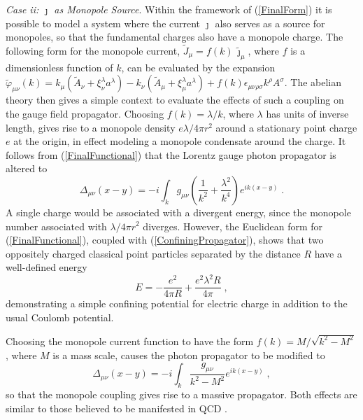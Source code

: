 \documentclass[a4paper,a4paper]{article}
\begin{document}
{\it Case ii: $\jmath$ as Monopole Source}.  Within the framework of (\ref{FinalForm}) it is possible to model a system where the current $\jmath$ also serves as a source for monopoles, so that the fundamental charges also have a monopole charge. The following form for the monopole current, $\tilde{J}_\mu  = f(k) \, \tilde{\jmath}_\mu$, where $f$ is a dimensionless function of $k$, can be evaluated by the expansion $\tilde{\varphi}_{\mu \nu} (k)  =   k_\mu ( \tilde{A}_\nu  + \xi^\lambda_\nu a^\lambda )  - k_\nu (  \tilde{A}_\mu  + \xi^\lambda_\mu a^\lambda ) + f(k) \epsilon_{\mu \nu \rho \sigma} k^\rho A^\sigma$.   The abelian theory then gives a simple context to evaluate the effects of such a coupling on the gauge field propagator.  Choosing $f(k) = \lambda/k$, where $\lambda$ has units of inverse length, gives rise to a monopole density $e \lambda / 4 \pi r^2$ around a stationary point charge $e$ at the origin, in effect modeling a monopole condensate around the charge.  It follows from (\ref{FinalFunctional}) that the Lorentz gauge photon propagator is altered to 
\begin{equation}
\label{ConfiningPropagator}
\Delta_{\mu \nu} (x - y)  = - i \int_k g_{\mu \nu} \left( \frac{1}{k^2} + \frac{\lambda^2}{k^4}  \right) e^{ik ( x - y ) } \;.
\end{equation}
A single charge would be associated with a divergent energy, since the monopole number associated with $\lambda/4 \pi r^2$ diverges. However, the Euclidean form for (\ref{FinalFunctional}), coupled with (\ref{ConfiningPropagator}), shows that two oppositely charged classical point particles separated by the distance $R$ have a well-defined energy  
\begin{equation}
\label{ConfiningPotential}
E = - \frac{e^2}{4 \pi R} + \frac{e^2 \lambda^2 R}{4 \pi} \; ,
\end{equation}
demonstrating a simple confining potential for electric charge in addition to the usual Coulomb potential. 

Choosing the monopole current function to have the form $f(k) = M/\sqrt{k^2 - M^2}$, where $M$ is a mass scale, causes the photon propagator to be modified to
\begin{equation}
\label{MassivePropagator}
\Delta_{\mu \nu} (x - y)  = - i \int_k \frac{g_{\mu \nu}}{k^2 - M^2} e^{ik ( x - y ) } \; ,
\end{equation}
so that the monopole coupling gives rise to a massive propagator. Both effects are similar to those believed to be manifested in QCD \cite{tHooftBruckmann}.
\end{document}
